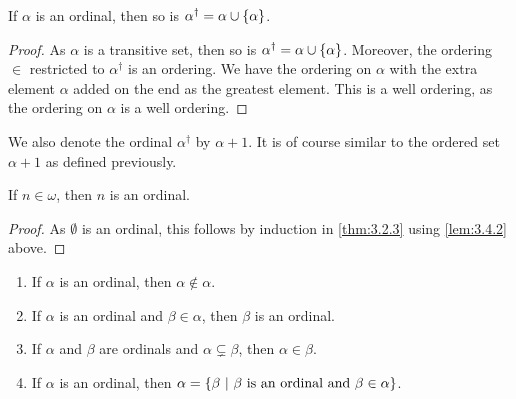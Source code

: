 \begin{lemma}
\label{lem:3.4.2}
If $ \alpha $ is an ordinal, then so is $ \alpha^\dagger = \alpha \cup \cbr{\alpha} $.
\end{lemma}

\begin{proof}
As $ \alpha $ is a transitive set, then so is $ \alpha^\dagger = \alpha \cup \cbr{\alpha} $. Moreover, the ordering $ \in $ restricted to $ \alpha^\dagger $ is an ordering. We have the ordering on $ \alpha $ with the extra element $ \alpha $ added on the end as the greatest element. This is a well ordering, as the ordering on $ \alpha $ is a well ordering.
\end{proof}

We also denote the ordinal $ \alpha^\dagger $ by $ \alpha + 1 $. It is of course similar to the ordered set $ \alpha + 1 $ as defined previously.

\begin{corollary}
If $ n \in \omega $, then $ n $ is an ordinal.
\end{corollary}

\begin{proof}
As $ \emptyset $ is an ordinal, this follows by induction in \ref{thm:3.2.3} using \ref{lem:3.4.2} above.
\end{proof}

\begin{proposition}
\label{prop:3.4.4}
\hfill
\begin{enumerate}
\item If $ \alpha $ is an ordinal, then $ \alpha \notin \alpha $.
\item If $ \alpha $ is an ordinal and $ \beta \in \alpha $, then $ \beta $ is an ordinal.
\item If $ \alpha $ and $ \beta $ are ordinals and $ \alpha \subsetneq \beta $, then $ \alpha \in \beta $.
\item If $ \alpha $ is an ordinal, then $ \alpha = \cbr{\beta \st \beta \ \text{is an ordinal and} \ \beta \in \alpha} $.
\end{enumerate}
\end{proposition}


